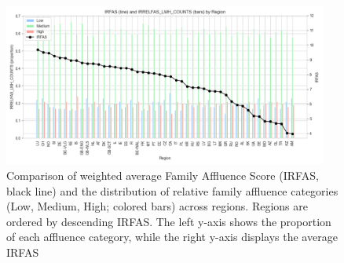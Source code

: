 \begin{figure}[htbp]
    \centering
    \includegraphics[width=0.95\textwidth]{Report/final_report/pictures/IRFASvsIRRELFAS.png}
    \caption{Comparison of weighted average Family Affluence Score (IRFAS, black line) and the distribution of relative family affluence categories (Low, Medium, High; colored bars) across regions. Regions are ordered by descending IRFAS. The left y-axis shows the proportion of each affluence category, while the right y-axis displays the average IRFAS}
    \label{fig:IRFASvsIRRELFAS}
\end{figure}
